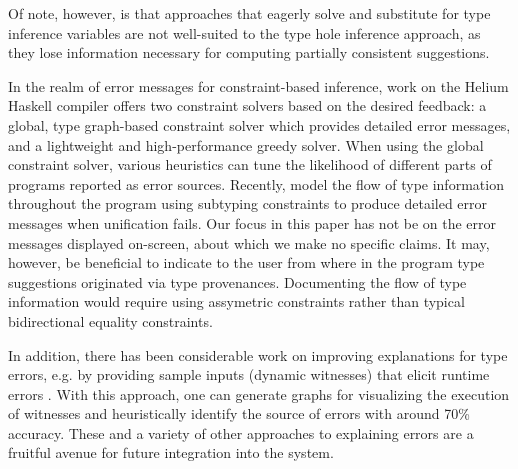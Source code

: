 Of note, however, is that approaches that eagerly solve and substitute for type inference variables \cite{odersky1999,pottier2014,mcadam1999} are not well-suited to the type hole inference approach, as they lose information necessary for computing partially consistent suggestions. 


In the realm of error messages for constraint-based inference, work on the Helium Haskell compiler \cite{heeren2003} offers two constraint solvers based on the desired feedback: a global, type graph-based constraint solver which provides detailed error messages, and a lightweight and high-performance greedy solver. When using the global constraint solver, various heuristics can tune the likelihood of different parts of programs reported as error sources.
Recently, \citet{bhanuka2023} model the flow of type information throughout the program using subtyping constraints to produce detailed error messages when unification fails.
Our focus in this paper has not be on the error messages displayed on-screen, about which we make no specific claims.
It may, however, be beneficial to indicate to the user from where in the program type suggestions originated via type provenances. Documenting the flow of type information would require using assymetric constraints rather than typical bidirectional equality constraints. 

In addition, there has been considerable work on improving explanations for type errors, e.g. by providing sample inputs (dynamic witnesses) that elicit runtime errors \cite{seidel2016}. With this approach, one can generate graphs for visualizing the execution of witnesses and heuristically identify the source of errors with around 70\% accuracy.
These and a variety of other approaches to explaining errors are a fruitful avenue for future integration into the system.
